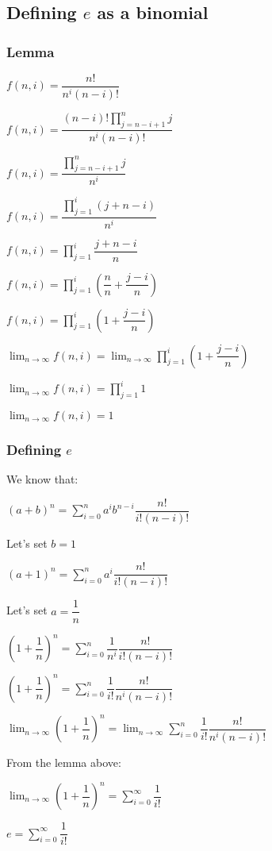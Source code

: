 
\subsection{Defining \(e\) as a binomial}

\subsubsection{Lemma}

\(f(n,i)=\dfrac{n!}{n^i(n-i)!}\)

\(f(n,i)=\dfrac{(n-i)!\prod_{j=n-i+1}^nj}{n^i(n-i)!}\)

\(f(n,i)=\dfrac{\prod_{j=n-i+1}^nj}{n^i}\)

\(f(n,i)=\dfrac{\prod_{j=1}^i(j+n-i)}{n^i}\)

\(f(n,i)=\prod_{j=1}^i\dfrac{j+n-i}{n}\)

\(f(n,i)=\prod_{j=1}^i(\dfrac{n}{n}+\dfrac{j-i}{n})\)

\(f(n,i)=\prod_{j=1}^i(1+\dfrac{j-i}{n})\)

\(\lim_{n\rightarrow \infty }f(n,i)=\lim_{n\rightarrow \infty }\prod_{j=1}^i(1+\dfrac{j-i}{n})\)

\(\lim_{n\rightarrow \infty }f(n,i)=\prod_{j=1}^i1\)

\(\lim_{n\rightarrow \infty }f(n,i)=1\)

\subsubsection{Defining \(e\)}

We know that:

\((a+b)^n=\sum^n_{i=0} a^i b^{n-i} \dfrac{n!}{i!(n-i)!}\)

Let's set \(b=1\)

\((a+1)^n=\sum^n_{i=0} a^i \dfrac{n!}{i!(n-i)!}\)

Let's set \(a=\dfrac{1}{n}\)

\((1+\dfrac{1}{n})^{n}=\sum^{n}_{i=0} \dfrac{1}{n^i} \dfrac{n!}{i!(n-i)!}\)

\((1+\dfrac{1}{n})^{n}=\sum^{n}_{i=0} \dfrac{1}{i!} \dfrac{n!}{n^i(n-i)!}\)

\(\lim_{n\rightarrow \infty }(1+\dfrac{1}{n})^{n}=\lim_{n\rightarrow \infty }\sum^{n}_{i=0} \dfrac{1}{i!} \dfrac{n!}{n^i(n-i)!}\)

From the lemma above:

\(\lim_{n\rightarrow \infty }(1+\dfrac{1}{n})^{n}=\sum^{\infty }_{i=0} \dfrac{1}{i!}\)

\(e=\sum^{\infty }_{i=0} \dfrac{1}{i!}\)

